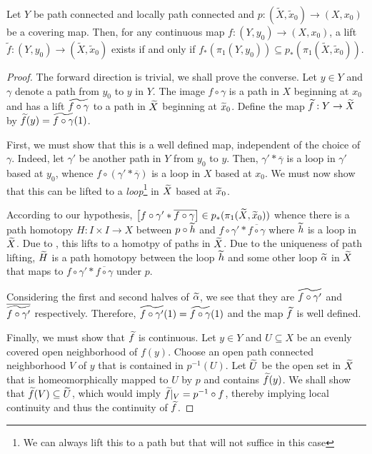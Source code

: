 \begin{theorem}
    Let $Y$ be path connected and locally path connected and $p:(\widetilde X,\widetilde x_0)\to(X,x_0)$ be a covering map. Then, for any continuous map $f:(Y,y_0)\to(X,x_0)$, a lift $\widetilde{f}:(Y,y_0)\to(\widetilde X,\widetilde x_0)$ exists if and only if $f_*(\pi_1(Y,y_0))\subseteq p_*(\pi_1(\widetilde X,\widetilde x_0))$.
\end{theorem}
\begin{proof}
    The forward direction is trivial, we shall prove the converse. Let $y\in Y$ and $\gamma$ denote a path from $y_0$ to $y$ in $Y$. The image $f\circ\gamma$ is a path in $X$ beginning at $x_0$ and has a lift $\widetilde{f\circ\gamma}$ to a path in $\widetilde{X}$ beginning at $\widetilde{x}_0$. Define the map $\widetilde{f}: Y\to\widetilde{X}$ by $\widetilde{f}(y) = \widetilde{f\circ\gamma}(1)$. 

    First, we must show that this is a well defined map, independent of the choice of $\gamma$. Indeed, let $\gamma'$ be another path in $Y$ from $y_0$ to $y$. Then, $\gamma'\ast\overline\gamma$ is a loop in $\gamma'$ based at $y_0$, whence $f\circ(\gamma'\ast\overline\gamma)$ is a loop in $X$ based at $x_0$. We must now show that this can be lifted to a \emph{loop}\footnote{We can always lift this to a path but that will not suffice in this case} in $\widetilde{X}$ based at $\widetilde{x}_0$. 

    According to our hypothesis, $\left[{f\circ\gamma'} * \overline{{f\circ\gamma}}\right]\in p_\ast(\pi_1(\widetilde{X},\widetilde{x}_0))$ whence there is a path homotopy $H: I\times I\to X$ between $p\circ\widetilde{h}$ and ${f\circ\gamma'} * \overline{{f\circ\gamma}}$ where $\widetilde{h}$ is a loop in $\widetilde{X}$. Due to , this lifts to a homotpy of paths in $\widetilde{X}$. Due to the uniqueness of path lifting, $\widetilde{H}$ is a path homotopy between the loop $\widetilde{h}$ and some other loop $\widetilde{\alpha}$ in $\widetilde{X}$ that maps to ${f\circ\gamma'} * \overline{{f\circ\gamma}}$ under $p$. 

    Considering the first and second halves of $\widetilde{\alpha}$, we see that they are $\widetilde{f\circ\gamma'}$ and $\overline{\widetilde{f\circ\gamma'}}$ respectively. Therefore, $\widetilde{f\circ\gamma'}(1) = \widetilde{f\circ\gamma}(1)$ and the map $\widetilde{f}$ is well defined.

    Finally, we must show that $\widetilde{f}$ is continuous. Let $y\in Y$ and $U\subseteq X$ be an evenly covered open neighborhood of $f(y)$. Choose an open path connected neighborhood $V$ of $y$ that is contained in $p^{-1}(U)$. Let $\widetilde{U}$ be the open set in $\widetilde{X}$ that is homeomorphically mapped to $U$ by $p$ and contains $\widetilde{f}(y)$. We shall show that $\widetilde{f}(V)\subseteq\widetilde{U}$, which would imply $\widetilde{f}|_V = p^{-1}\circ f$, thereby implying local continuity and thus the continuity of $\widetilde{f}$.


\end{proof}
